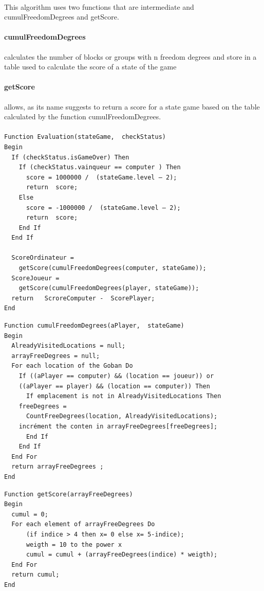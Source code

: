 \documentclass[a4paper,12pt]{report}
\begin{document}
	  \paragraph*{}
	  This algorithm uses two functions that are intermediate and cumulFreedomDegrees and getScore.
	  \paragraph*{cumulFreedomDegrees}
	   calculates the number of blocks or groups with n freedom degrees 
	  and store in a table used to calculate the score of a state of the game
	  \paragraph*{getScore}
	    allows, as its name suggests to return a score for a state game based on the table calculated by the function cumulFreedomDegrees.
	   \paragraph*{}
	      \begin{verbatim}
Function Evaluation(stateGame,  checkStatus)
Begin
  If (checkStatus.isGameOver) Then
    If (checkStatus.vainqueur == computer ) Then
      score = 1000000 /  (stateGame.level – 2);
      return  score;
    Else
      score = -1000000 /  (stateGame.level – 2);
      return  score;
    End If
  End If

  ScoreOrdinateur =
	getScore(cumulFreedomDegrees(computer, stateGame));
  ScoreJoueur =
	getScore(cumulFreedomDegrees(player, stateGame));
  return   ScroreComputer -  ScorePlayer;
End
 \end{verbatim}

      \begin{verbatim}
Function cumulFreedomDegrees(aPlayer,  stateGame)
Begin
  AlreadyVisitedLocations = null;
  arrayFreeDegrees = null;
  For each location of the Goban Do
    If ((aPlayer == computer) && (location == joueur)) or 
	((aPlayer == player) && (location == computer)) Then
      If emplacement is not in AlreadyVisitedLocations Then
	freeDegrees =
	  CountFreeDegrees(location, AlreadyVisitedLocations);
	incrément the conten in arrayFreeDegrees[freeDegrees];
      End If
    End If
  End For
  return arrayFreeDegrees ;
End
 \end{verbatim}

  \begin{verbatim}
Function getScore(arrayFreeDegrees)
Begin
  cumul = 0;
  For each element of arrayFreeDegrees Do
      (if indice > 4 then x= 0 else x= 5-indice);
      weigth = 10 to the power x
      cumul = cumul + (arrayFreeDegrees(indice) * weigth);
  End For
  return cumul;
End

 \end{verbatim}
\end{document}
